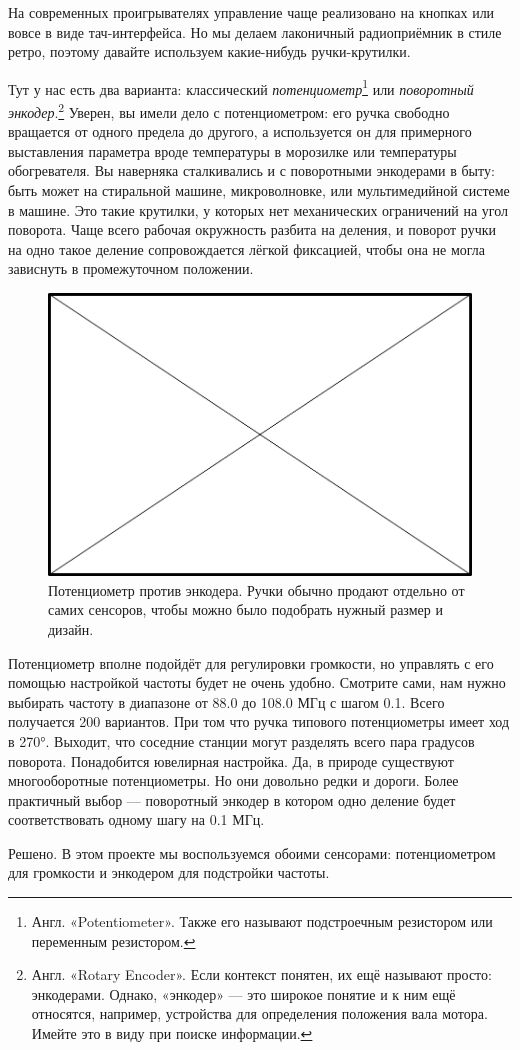 На современных проигрывателях управление чаще реализовано на кнопках или вовсе в виде тач-интерфейса. Но мы делаем лаконичный радиоприёмник в стиле ретро, поэтому давайте используем какие-нибудь ручки-крутилки.

Тут у нас есть два варианта: классический \emph{потенциометр}\footnote{Англ.  «Potentiometer». Также его называют подстроечным резистором или переменным резистором.} или \emph{поворотный энкодер}.\footnote{Англ.  «Rotary Encoder». Если контекст понятен, их ещё называют просто: энкодерами. Однако, «энкодер» — это широкое понятие и к ним ещё относятся, например, устройства для определения положения вала мотора.  Имейте это в виду при поиске информации.} Уверен, вы имели дело с потенциометром: его ручка свободно вращается от одного предела до другого, а используется он для примерного выставления параметра вроде температуры в морозилке или температуры обогревателя. Вы наверняка сталкивались и с поворотными энкодерами в быту: быть может на стиральной машине, микроволновке, или мультимедийной системе в машине. Это такие крутилки, у которых нет механических ограничений на угол поворота. Чаще всего рабочая окружность разбита на деления, и поворот ручки на одно такое деление сопровождается лёгкой фиксацией, чтобы она не могла зависнуть в промежуточном положении. 

\begin{figure}
\centering
\includegraphics{TODO.png}
\caption{Потенциометр против энкодера. Ручки обычно продают отдельно от
самих сенсоров, чтобы можно было подобрать нужный размер и дизайн.}
\end{figure}

Потенциометр вполне подойдёт для регулировки громкости, но управлять с его помощью настройкой частоты будет не очень удобно. Смотрите сами, нам нужно выбирать частоту в диапазоне от 88.0 до 108.0 МГц с шагом 0.1. Всего получается 200 вариантов. При том что ручка типового потенциометры имеет ход в 270°. Выходит, что соседние станции могут разделять всего пара градусов поворота. Понадобится ювелирная настройка. Да, в природе существуют многооборотные потенциометры. Но они довольно редки и дороги. Более практичный выбор — поворотный энкодер в котором одно деление будет соответствовать одному шагу на 0.1 МГц.

Решено. В этом проекте мы воспользуемся обоими сенсорами: потенциометром для громкости и энкодером для подстройки частоты.

